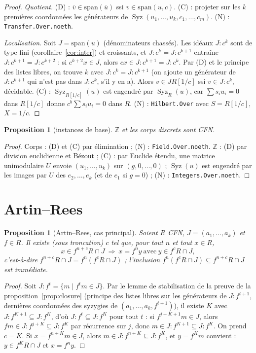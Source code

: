 \documentclass[11pt]{amsart}
\newtheorem{proposition}[theorem]{Proposition}
\theoremstyle{definition}
\theoremstyle{remark}
\DeclareMathOperator{\Syz}{Syz}
\newcommand{\sm}{\mathrm{span}}
\begin{document}
\begin{proof}
\emph{Quotient.} (D) : $\bar v\in\sm(\bar u)$ ssi $v\in\sm(u,c)$. (C) :
projeter sur les $k$ premières coordonnées les générateurs de
$\Syz(u_1,\dots,u_k,c_1,\dots,c_m)$. (N) : \texttt{Transfer.Over.noeth}.

\emph{Localisation.} Soit $J=\sm(u)$ (dénominateurs chassés). Les idéaux
$J:c^k$ sont de type fini (corollaire~\ref{cor:inter}) et croissants, et
$J:c^k=J:c^{k+1}$ entraîne $J:c^{k+1}=J:c^{k+2}$ : si $c^{k+2}x\in J$,
alors $cx\in J:c^{k+1}=J:c^k$. Par (D) et le principe des listes libres,
on trouve $k$ avec $J:c^k=J:c^{k+1}$ (on ajoute un générateur de
$J:c^{k+1}$ qui n'est pas dans $J:c^k$, s'il y en a). Alors $v\in JR[1/c]$
ssi $v\in J:c^k$, décidable. (C) : $\Syz_{R[1/c]}(u)$ est engendré par
$\Syz_R(u)$, car $\sum s_iu_i=0$ dans $R[1/c]$ donne
$c^b\sum s_iu_i=0$ dans $R$. (N) : \texttt{Hilbert.Over} avec $S=R[1/c]$,
$X=1/c$.
\end{proof}

\begin{proposition}[instances de base]\label{prop:base}
$\mathbb Z$ et les corps discrets sont CFN.
\end{proposition}

\begin{proof}
Corps : (D) et (C) par élimination ; (N) : \texttt{Field.Over.noeth}.
$\mathbb Z$ : (D) par division euclidienne et Bézout ; (C) : par
Euclide étendu, une matrice unimodulaire $U$ envoie $(u_1,\dots,u_k)$ sur
$(g,0,\dots,0)$ ; $\Syz(u)$ est engendré par les images par $U$ des
$e_2,\dots,e_k$ (et de $e_1$ si $g=0$) ; (N) : \texttt{Integers.Over.noeth}.
\end{proof}

\section{Artin--Rees}\label{sec:ar}

\begin{proposition}[Artin--Rees, cas principal]\label{prop:arp}
Soient $R$ CFN, $J=(a_1,\dots,a_k)$ et $f\in R$. Il existe (sous
troncation) $c$ tel que, pour tout $n$ et tout $x\in R$,
\[x\in f^{n+c}R\cap J\ \Longrightarrow\ x=f^ny\ \text{avec}\ y\in f^cR\cap J,\]
c'est-à-dire $f^{n+c}R\cap J=f^n(f^cR\cap J)$ ; l'inclusion
$f^n(f^cR\cap J)\subseteq f^{n+c}R\cap J$ est immédiate.
\end{proposition}

\begin{proof}
Soit $J:f^t=\{m\mid f^tm\in J\}$. Par le lemme de stabilisation de la
preuve de la proposition~\ref{prop:closure} (principe des listes libres
sur les générateurs de $J:f^{t+1}$, dernières coordonnées des syzygies
de $(a_1,\dots,a_k,f^{t+1})$), il existe $K$ avec
$J:f^{K+1}\subseteq J:f^K$, d'où $J:f^t\subseteq J:f^K$ pour tout $t$ :
si $f^{j+K+1}m\in J$, alors $fm\in J:f^{j+K}\subseteq J:f^K$ par
récurrence sur $j$, donc $m\in J:f^{K+1}\subseteq J:f^K$. On prend $c=K$.
Si $x=f^{n+K}m\in J$, alors $m\in J:f^{n+K}\subseteq J:f^K$, et
$y=f^Km$ convient : $y\in f^KR\cap J$ et $x=f^ny$.
\end{proof}
\end{document}
